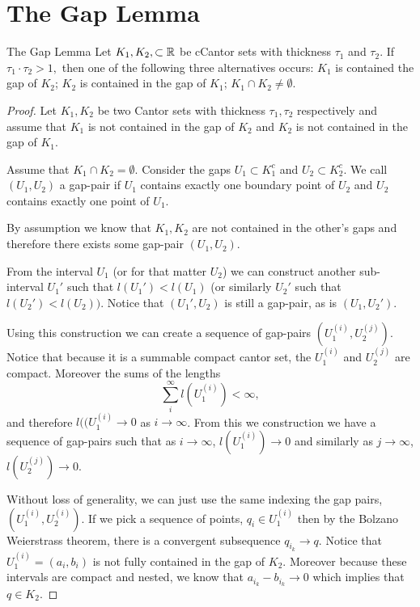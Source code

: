 \section{The Gap Lemma}
\begin{lemma}{The Gap Lemma}\cite{palis&takens}
    Let $K_1, K_2, \subset \mathbb{R}$ be cCantor sets with thickness $\tau_1$ and  $\tau_2$.  If $\tau_1 \cdot \tau_2 >1,$ then one of the following three alternatives occurs: $K_1$ is contained the gap of $K_2$; $K_2$ is contained in the gap of $K_1$; $K_1 \cap K_2 \neq \emptyset.$
\end{lemma}
\begin{proof}
    Let $K_1, K_2$ be two Cantor sets with thickness $\tau_1, \tau_2$ respectively and assume that $K_1$ is not contained in the gap of $K_2$ and $K_2$ is not contained in the gap of $K_1$.  

    Assume that $K_1 \cap K_2 = \emptyset$.  Consider the gaps $U_1 \subset K_1^c$ and $U_2 \subset K_2^c$.  We call $(U_1, U_2)$ a gap-pair if $U_1$ contains exactly one boundary point of $U_2$ and $U_2$ contains exactly one point of $U_1$.  

    By assumption we know that $K_1, K_2$ are not contained in the other's gaps and therefore there exists some gap-pair $(U_1, U_2).$

    From the interval $U_1$ (or for that matter $U_2$) we can construct another sub-interval $U_1'$ such that $l(U_1') < l(U_1)$ (or similarly $U_2'$ such that $l(U_2')<l(U_2)).$  Notice that $(U_1',U_2)$ is still a gap-pair, as is $(U_1,U_2')$.
    
    Using this construction we can create a sequence of gap-pairs $(U_1^{(i)}, U_2^{(j)})$.  Notice that because it is a summable compact cantor set, the $U_1^{(i)}$ and $U_2^{(j)}$ are compact.  Moreover the sums of the lengths $$\sum_i^\infty l(U_1^{(i)}) < \infty,$$ and therefore $l((U_1^{(i)} \to 0$ as $i \to \infty$.   From this we construction we have a sequence of gap-pairs such that as $i \to \infty$, $l(U_1^{(i)}) \to 0$ and similarly as $j \to \infty$, $l(U_2^{(j)}) \to 0$.  
    
    Without loss of generality, we can just use the same indexing the gap pairs, $(U_1^{(i)}, U_2^{(i)})$.  If we pick a sequence of points, $q_{i} \in U_1^{(i)}$ then by the Bolzano Weierstrass theorem, there is a convergent subsequence $q_{i_k} \to q$.  Notice that $U_1^{(i)} = (a_i, b_i)$ is not fully contained in the gap of $K_2$.  Moreover because these intervals are compact and nested, we know that $a_{i_k} - b_{i_k} \to 0$ which implies that $q \in K_2$.  


\end{proof}
